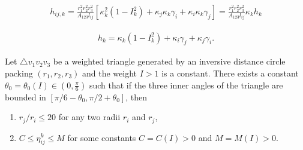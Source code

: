 \documentclass[10pt,a4paper]{amsart}
\begin{document}
		\begin{equation}\label{h_ij,k}
			\begin{aligned}
				h_{ij,k}
			=\frac{r_1^2r_2^2r_3^2}{A_{123}l_{ij}}[\kappa_k^2(1-I_k^2)+\kappa_j\kappa_k\gamma_{i}+\kappa_i\kappa_k\gamma_{j}]
				=\frac{r_1^2r_2^2r_3^2}{A_{123}l_{ij}}\kappa_kh_k
			\end{aligned}
		\end{equation}

		\begin{equation}
		\label{h_i}
			\begin{aligned}
h_k=\kappa_k(1-I_k^2)+\kappa_i\gamma_{j}+\kappa_j\gamma_{i}.
			\end{aligned}
		\end{equation}

\begin{lemma}
\label{ratio}
	Let $\triangle v_1v_2v_3$ be a weighted triangle generated by an inversive distance  circle packing $(r_1, r_2, r_3)$ and the weight $I>1$ is a constant. There exists a constant $\theta_0 = \theta_0(I)\in (0, \frac{\pi}{6})$ such that if the three inner angles of the triangle are bounded in $[\pi /6 - \theta_0,  \pi/2 + \theta_0]$, then
	\begin{enumerate}
		\item[(a)] $r_j/r_i \leq 20$ for any two radii $r_i$ and $r_j$,
		\item[(b)] $C\leq \eta_{ij}^k \leq M$ for some constants $C = C(I)>0$  and $M = M(I)>0$.
	\end{enumerate}
\end{lemma}
\end{document}
